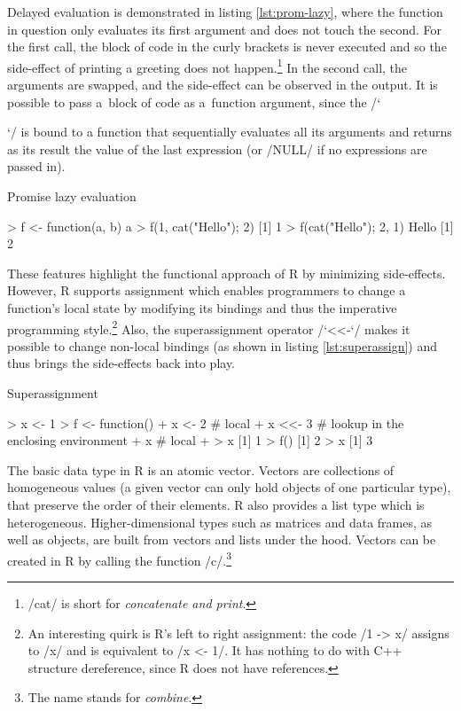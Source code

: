 Delayed evaluation is demonstrated in listing \ref{lst:prom-lazy}, where the function in question only evaluates its first argument and does not touch the second. For the first call, the block of code in the curly brackets is never executed and so the side-effect of printing a greeting does not happen.\footnote{\rinline/cat/ is short for \emph{concatenate and print}.} In the second call, the arguments are swapped, and the side-effect can be observed in the output. It is possible to pass a~block of code as a~function argument, since the \rinline/`{`/ is bound to a function that sequentially evaluates all its arguments and returns as its result the value of the last expression (or \rinline/NULL/ if no expressions are passed in).

\begin{listing}[htbp]
  \caption{\label{lst:prom-lazy}Promise lazy evaluation}
  \begin{rcode}
> f <- function(a, b) a
> f(1, {cat("Hello\n"); 2})
[1] 1
> f({cat("Hello\n"); 2}, 1)
Hello
[1] 2
  \end{rcode}
\end{listing}

These features highlight the functional approach of R by minimizing side-effects. However, R supports assignment which enables programmers to change a function's local state by modifying its bindings and thus the imperative programming style.\footnote{An interesting quirk is R's left to right assignment: the code \rinline/1 -> x/ assigns to \rinline/x/ and is equivalent to \rinline/x <- 1/. It has nothing to do with C++ structure dereference, since R does not have references.} Also, the superassignment operator \rinline/`<<-`/ makes it possible to change non-local bindings (as shown in listing \ref{lst:superassign}) and thus brings the side-effects back into play.

\begin{listing}[htbp]
  \caption{\label{lst:superassign}Superassignment}
  \begin{rcode}
> x <- 1
> f <- function() {
+     x <- 2  # local
+     x <<- 3  # lookup in the enclosing environment
+     x  # local
+ }
> x
[1] 1
> f()
[1] 2
> x
[1] 3
  \end{rcode}
\end{listing}

The basic data type in R is an atomic vector. Vectors are collections of homogeneous values (a given vector can only hold objects of one particular type), that preserve the order of their elements. R also provides a list type which is heterogeneous. Higher-dimensional types such as matrices and data frames, as well as objects, are built from vectors and lists under the hood. Vectors can be created in R by calling the function \rinline/c/.\footnote{The name stands for \emph{combine}.}

}
